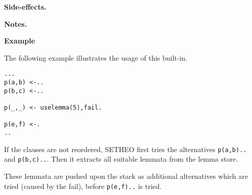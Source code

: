  

\vspace*{0.5cm}
\noindent
{\bf Side-effects.}

\vspace*{0.5cm}
\noindent
{\bf Notes.}

\vspace*{0.5cm}
\noindent
{\bf Example}
 
The following example illustrates the usage of this built-in.
\begin{verbatim}
...
p(a,b) <-..
p(b,c) <-..
 
p(_,_) <- uselemma(5),fail.
 
p(e,f) <-.
..
\end{verbatim}
 
If the clauses are not reordered, SETHEO first tries the alternatives
{\tt p(a,b)..} and {\tt p(b,c)..}.
Then it extracts all suitable lemmata from the lemma store.
 
These lemmata are pushed upon the stack as additional alternatives
which are tried (caused by the fail), before {\tt p(e,f)..} is tried.

